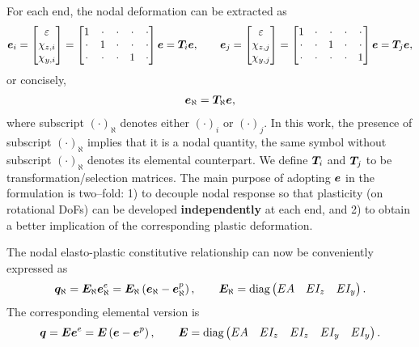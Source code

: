 For each end, the nodal deformation can be extracted as
\begin{gather}
\bm{e}_i=\begin{bmatrix}
\varepsilon\\\chi_{z,i}\\\chi_{y,i}
\end{bmatrix}=\begin{bmatrix}
1&\cdot&\cdot&\cdot&\cdot\\
\cdot&1&\cdot&\cdot&\cdot\\
\cdot&\cdot&\cdot&1&\cdot
\end{bmatrix}\bm{e}=\bm{T}_i\bm{e},\qquad
\bm{e}_j=\begin{bmatrix}
\varepsilon\\\chi_{z,j}\\\chi_{y,j}
\end{bmatrix}=\begin{bmatrix}
1&\cdot&\cdot&\cdot&\cdot\\
\cdot&\cdot&1&\cdot&\cdot\\
\cdot&\cdot&\cdot&\cdot&1
\end{bmatrix}\bm{e}=\bm{T}_j\bm{e},
\end{gather}
or concisely,
\begin{gather}
\bm{e}_\aleph=\bm{T}_\aleph\bm{e},
\end{gather}
where subscript $\left(\cdot\right)_\aleph$ denotes either $\left(\cdot\right)_i$ or $\left(\cdot\right)_j$.
In this work, the presence of subscript $\left(\cdot\right)_\aleph$ implies that it is a nodal quantity, the same symbol without subscript $\left(\cdot\right)_\aleph$ denotes its elemental counterpart.
We define $\bm{T}_i$ and $\bm{T}_j$ to be transformation/selection matrices.
The main purpose of adopting $\bm{e}$ in the formulation is two--fold: 1) to decouple nodal response so that plasticity (on rotational DoFs) can be developed \textbf{independently} at each end, and 2) to obtain a better implication of the corresponding plastic deformation.

The nodal elasto-plastic constitutive relationship can now be conveniently expressed as
\begin{gather}
\bm{q}_\aleph=\bm{E}_\aleph\bm{e}_\aleph^e=\bm{E}_\aleph\left(\bm{e}_\aleph-\bm{e}_\aleph^p\right),\qquad\bm{E}_\aleph=\text{diag}\left(\begin{matrix}
EA&EI_z&EI_y
\end{matrix}\right).
\end{gather}
The corresponding elemental version is
\begin{gather}
\bm{q}=\bm{E}\bm{e}^e=\bm{E}\left(\bm{e}-\bm{e}^p\right),\qquad\bm{E}=\text{diag}\left(\begin{matrix}
EA&EI_z&EI_z&EI_y&EI_y
\end{matrix}\right).
\end{gather}

